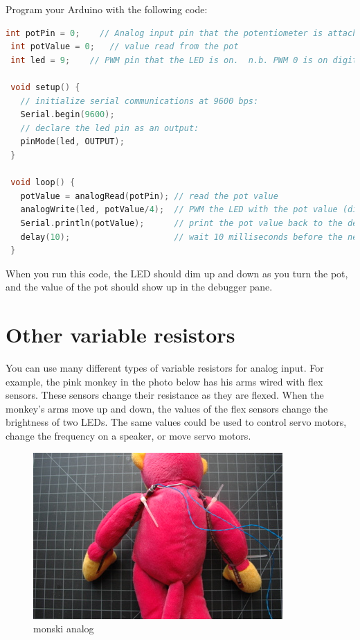 Program your Arduino with the following code:

\begin{lstlisting}[language=C]
 int potPin = 0;    // Analog input pin that the potentiometer is attached to
 int potValue = 0;   // value read from the pot
 int led = 9;    // PWM pin that the LED is on.  n.b. PWM 0 is on digital pin 9

 void setup() {
   // initialize serial communications at 9600 bps:
   Serial.begin(9600); 
   // declare the led pin as an output:
   pinMode(led, OUTPUT);
 }

 void loop() {
   potValue = analogRead(potPin); // read the pot value
   analogWrite(led, potValue/4);  // PWM the LED with the pot value (divided by 4 to fit in a byte)
   Serial.println(potValue);      // print the pot value back to the debugger pane
   delay(10);                     // wait 10 milliseconds before the next loop
 }
\end{lstlisting}

When you run this code, the LED should dim up and down as you turn the pot, and the value of the pot should show up in the debugger pane.

\section{Other variable resistors}

You can use many different types of variable resistors for analog input. For example, the pink monkey in the photo below has his arms wired with flex sensors. These sensors change their resistance as they are flexed. When the monkey's arms move up and down, the values of the flex sensors change the brightness of two LEDs. The same values could be used to control servo motors, change the frequency on a speaker, or move servo motors.

\begin{figure}[!htb]
 \centering
 \includegraphics[scale=0.6]{img/analogio/monski_analog.jpg}
 \caption{monski analog}
 \label{monski analog}
\end{figure}

